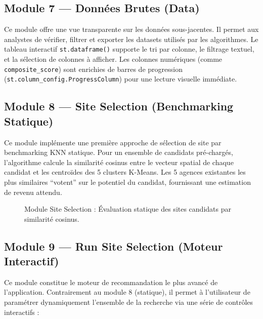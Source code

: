 \subsection{Module 7 — Données Brutes (Data)}

Ce module offre une vue transparente sur les données sous-jacentes. Il permet aux analystes de vérifier, filtrer et exporter les datasets utilisés par les algorithmes. Le tableau interactif \texttt{st.dataframe()} supporte le tri par colonne, le filtrage textuel, et la sélection de colonnes à afficher. Les colonnes numériques (comme \texttt{composite\_score}) sont enrichies de barres de progression (\texttt{st.column\_config.ProgressColumn}) pour une lecture visuelle immédiate.

\subsection{Module 8 — Site Selection (Benchmarking Statique)}

Ce module implémente une première approche de sélection de site par benchmarking KNN statique. Pour un ensemble de candidats pré-chargés, l'algorithme calcule la similarité cosinus entre le vecteur spatial de chaque candidat et les centroïdes des 5 clusters K-Means. Les 5 agences existantes les plus similaires ``votent'' sur le potentiel du candidat, fournissant une estimation de revenu attendu.

\begin{figure}[h]
    \centering
    \caption{Module Site Selection : Évaluation statique des sites candidats par similarité cosinus.}
    \label{fig:screenshot_sitesel}
\end{figure}

\subsection{Module 9 — Run Site Selection (Moteur Interactif)}

Ce module constitue le moteur de recommandation le plus avancé de l'application. Contrairement au module 8 (statique), il permet à l'utilisateur de paramétrer dynamiquement l'ensemble de la recherche via une série de contrôles interactifs :

